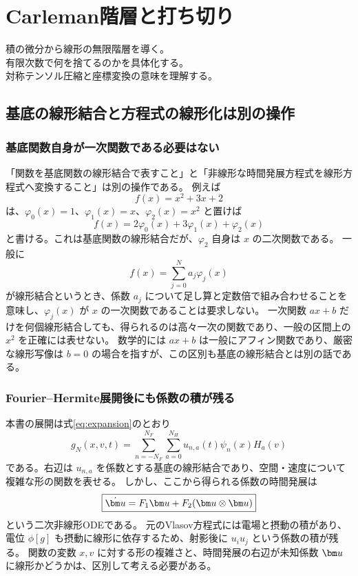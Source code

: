 \chapter{Carleman階層と打ち切り}
\begin{chaptergoal}
\cgitem 積の微分から線形の無限階層を導く。\\
\cgitem 有限次数で何を捨てるのかを具体化する。\\
\cgitem 対称テンソル圧縮と座標変換の意味を理解する。
\end{chaptergoal}

\section{基底の線形結合と方程式の線形化は別の操作}
\subsection{基底関数自身が一次関数である必要はない}
「関数を基底関数の線形結合で表すこと」と「非線形な時間発展方程式を線形方程式へ変換すること」は別の操作である。
例えば
\[
f(x)=x^2+3x+2
\]
は、$\varphi_0(x)=1$、$\varphi_1(x)=x$、$\varphi_2(x)=x^2$ と置けば
\[
f(x)=2\varphi_0(x)+3\varphi_1(x)+\varphi_2(x)
\]
と書ける。これは基底関数の線形結合だが、$\varphi_2$ 自身は $x$ の二次関数である。
一般に
\[
\boxed{f(x)=\sum_{j=0}^{N}a_j\varphi_j(x)}
\]
が線形結合というとき、係数 $a_j$ について足し算と定数倍で組み合わせることを意味し、$\varphi_j(x)$ が $x$ の一次関数であることは要求しない。
一次関数 $ax+b$ だけを何個線形結合しても、得られるのは高々一次の関数であり、一般の区間上の $x^2$ を正確には表せない。
数学的には $ax+b$ は一般にアフィン関数であり、厳密な線形写像は $b=0$ の場合を指すが、この区別も基底の線形結合とは別の話である。

\subsection{Fourier--Hermite展開後にも係数の積が残る}
本書の展開は式\eqref{eq:expansion}のとおり
\[
g_N(x,v,t)=\sum_{n=-N_F}^{N_F}\sum_{a=0}^{N_H}
u_{n,a}(t)\psi_n(x)H_a(v)
\]
である。右辺は $u_{n,a}$ を係数とする基底の線形結合であり、空間・速度について複雑な形の関数を表せる。
しかし、ここから得られる係数の時間発展は
\[
\boxed{\dot\uu=F_1\uu+F_2(\uu\otimes\uu)}
\]
という二次非線形ODEである。
元のVlasov方程式には電場と摂動の積があり、電位 $\phi[g]$ も摂動に線形に依存するため、射影後に $u_i u_j$ という係数の積が残る。
関数の変数 $x,v$ に対する形の複雑さと、時間発展の右辺が未知係数 $\uu$ に線形かどうかは、区別して考える必要がある。

